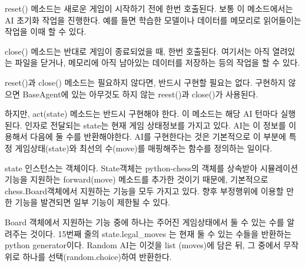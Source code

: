 \documentclass[letterpaper,10pt,english]{sphinxmanual}
\begin{document}
reset() 메소드는 새로운 게임이 시작하기 전에 한번 호출된다. 보통 이 메소드에서는 AI 초기화 작업을 진행한다.
예를 들면 학습한 모델이나 데이터를 메모리로 읽어들이는 작업을 이때 할 수 있다.

close() 메소드는 반대로 게임이 종료되었을 때, 한번 호출된다. 여기서는 아직 열려있는 파일을 닫거나,
메모리에 아직 남아있는 데이터를 저장하는 등의 작업을 할 수 있다.

reset()과 close() 메소드는 필요하지 않다면, 반드시 구현할 필요는 없다.
구현하지 않으면 BaseAgent에 있는 아무것도 하지 않는 reest()과 close()가 사용된다.

하지만, act(state) 메소드는 반드시 구현해야 한다. 이 메소드는 해당 AI 턴마다 실행된다.
인자로 전달되는 state는 현재 게임 상태정보를 가지고 있다. AI는 이 정보를 이용해서 다음에 둘 수를 반환해야한다.
AI를 구현한다는 것은 기본적으로 이 부분에 특정 게임상태(state)와 최선의 수(move)를 매핑해주는 함수를 정의하는 일이다.

state 인스턴스는 {\hyperref[\detokenize{scripts:scripts.run_game.State}]{}} 객체이다. State객체는 python-chess의  객체를 상속받아
시뮬레이션 기능을 지원하는 forward(move) 메소드를 추가한 것이기 때문에, 기본적으로 chess.Board객체에서 지원하는 기능을
모두 가지고 있다. 향후 부정행위에 이용할 만한 기능을 발견되면 일부 기능이 제한될 수 있다.

Board 객체에서 지원하는 기능 중에 하나는 주어진 게임상태에서 둘 수 있는 수를 알려주는 것이다. 15번째 줄의
state.legal\_moves 는 현재 둘 수 있는 수들을 반환하는 python generator이다. Random AI는 이것을 list (moves)에 담은 뒤,
그 중에서 무작위로 하나를 선택(random.choice)하여 반환한다.
\end{document}

